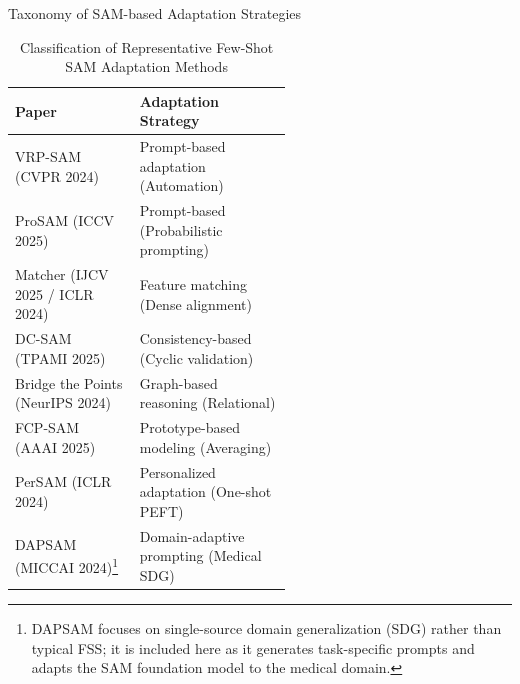 \documentclass[aspectratio=169, 10pt]{beamer}
\begin{document}
\begin{frame}{Taxonomy of SAM-based Adaptation Strategies}
    \begin{table}[htbp]
    \centering
    \caption{Classification of Representative Few-Shot SAM Adaptation Methods}
    \renewcommand{\arraystretch}{1.05}
    \small
    \begin{tabular}{l p{0.55\linewidth}}
    \toprule
    \textbf{Paper} & \textbf{Adaptation Strategy} \\
    \midrule
    VRP-SAM (CVPR 2024) \cite{sun2024vrp} & Prompt-based adaptation (Automation) \\
    ProSAM (ICCV 2025) \cite{wang2025prosam} & Prompt-based (Probabilistic prompting) \\
    Matcher (IJCV 2025 / ICLR 2024) \cite{liu2023matcher} & Feature matching (Dense alignment) \\
    DC-SAM (TPAMI 2025) \cite{qi2025dcsam} & Consistency-based (Cyclic validation) \\
    Bridge the Points (NeurIPS 2024) \cite{zhang2024bridge} & Graph-based reasoning (Relational) \\
    FCP-SAM (AAAI 2025) \cite{park2025fcpsam} & Prototype-based modeling (Averaging) \\
    PerSAM (ICLR 2024) \cite{zhang2024persam} & Personalized adaptation (One-shot PEFT) \\
    DAPSAM (MICCAI 2024)\footnote{\tiny DAPSAM focuses on single-source domain generalization (SDG) rather than typical FSS; it is included here as it generates task-specific prompts and adapts the SAM foundation model to the medical domain.} \cite{wei2024prompting} & Domain-adaptive prompting (Medical SDG) \\
    \bottomrule
    \end{tabular}
    \end{table}
\end{frame}
\end{document}
